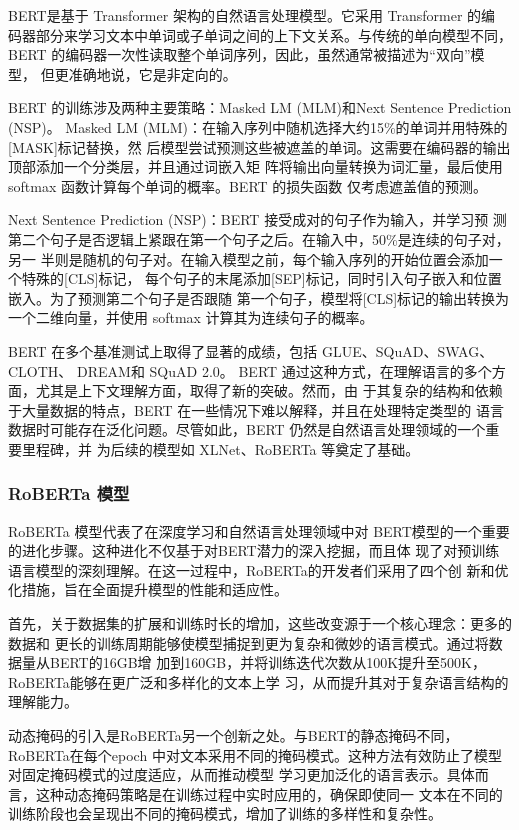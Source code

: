 BERT是基于 Transformer 架构的自然语言处理模型。它采用 Transformer 的编
码器部分来学习文本中单词或子单词之间的上下文关系。与传统的单向模型不同，
BERT 的编码器一次性读取整个单词序列，因此，虽然通常被描述为``双向''模型，
但更准确地说，它是非定向的。

BERT 的训练涉及两种主要策略：Masked LM (MLM)和Next Sentence Prediction (NSP)。
Masked LM (MLM)：在输入序列中随机选择大约15\%的单词并用特殊的[MASK]标记替换，然
后模型尝试预测这些被遮盖的单词。这需要在编码器的输出顶部添加一个分类层，并且通过词嵌入矩
阵将输出向量转换为词汇量，最后使用 softmax 函数计算每个单词的概率。BERT 的损失函数
仅考虑遮盖值的预测。

Next Sentence Prediction (NSP)：BERT 接受成对的句子作为输入，并学习预
测第二个句子是否逻辑上紧跟在第一个句子之后。在输入中，50\%是连续的句子对，另一
半则是随机的句子对。在输入模型之前，每个输入序列的开始位置会添加一个特殊的[CLS]标记，
每个句子的末尾添加[SEP]标记，同时引入句子嵌入和位置嵌入。为了预测第二个句子是否跟随
第一个句子，模型将[CLS]标记的输出转换为一个二维向量，并使用 softmax 计算其为连续句子的概率。

BERT 在多个基准测试上取得了显著的成绩，包括 
GLUE、SQuAD、SWAG\cite{zellers2018swag}、CLOTH\cite{xie2018large}、
DREAM\cite{sun2019dream}和 SQuAD 2.0。
BERT 通过这种方式，在理解语言的多个方面，尤其是上下文理解方面，取得了新的突破。然而，由
于其复杂的结构和依赖于大量数据的特点，BERT 在一些情况下难以解释，并且在处理特定类型的
语言数据时可能存在泛化问题。尽管如此，BERT 仍然是自然语言处理领域的一个重要里程碑，并
为后续的模型如 XLNet、RoBERTa 等奠定了基础。

\subsubsection*{RoBERTa 模型}
RoBERTa 模型代表了在深度学习和自然语言处理领域中对
BERT模型的一个重要的进化步骤。这种进化不仅基于对BERT潜力的深入挖掘，而且体
现了对预训练语言模型的深刻理解。在这一过程中，RoBERTa的开发者们采用了四个创
新和优化措施，旨在全面提升模型的性能和适应性。

首先，关于数据集的扩展和训练时长的增加，这些改变源于一个核心理念：更多的数据和
更长的训练周期能够使模型捕捉到更为复杂和微妙的语言模式。通过将数据量从BERT的16GB增
加到160GB，并将训练迭代次数从100K提升至500K，RoBERTa能够在更广泛和多样化的文本上学
习，从而提升其对于复杂语言结构的理解能力。

动态掩码的引入是RoBERTa另一个创新之处。与BERT的静态掩码不同，RoBERTa在每个epoch
中对文本采用不同的掩码模式。这种方法有效防止了模型对固定掩码模式的过度适应，从而推动模型
学习更加泛化的语言表示。具体而言，这种动态掩码策略是在训练过程中实时应用的，确保即使同一
文本在不同的训练阶段也会呈现出不同的掩码模式，增加了训练的多样性和复杂性。


